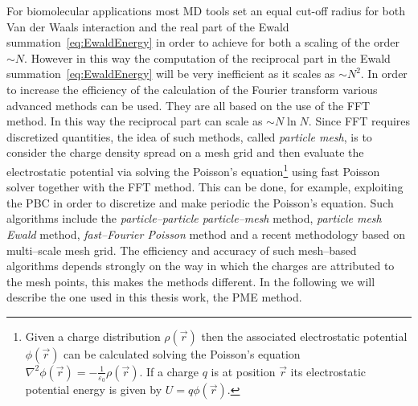 For biomolecular applications most \ac{MD} tools set an equal cut-off radius for both Van der Waals interaction
and the real part of the Ewald summation~\eqref{eq:EwaldEnergy} in order to achieve for both a scaling of the
order $\sim N$. However in this way the computation of the reciprocal part in the Ewald
summation~\eqref{eq:EwaldEnergy} will be very inefficient as it scales as $\sim N^2$. In order to increase the
efficiency of the calculation of the Fourier transform various advanced methods can be used. They are all based
on the use of the \ac{FFT} method. In this way the reciprocal part can scale as $\sim N\ln N$. Since \ac{FFT}
requires discretized quantities, the idea of such methods, called \textit{particle mesh}, is to consider the
charge density spread on a mesh grid and then evaluate the electrostatic potential via solving the Poisson's
equation\footnote{Given a charge distribution $\rho(\vec r)$ then the associated electrostatic potential
$\phi(\vec r)$ can be calculated solving the Poisson's equation $\displaystyle \nabla^2\phi(\vec r) = -\frac{1}{\varepsilon_0} \rho(\vec r)$. If a charge $q$ is at position $\vec r$ its electrostatic potential energy is given by $U = q\phi(\vec r)$.}
using fast Poisson solver together with the \ac{FFT} method. This can be done, for example, exploiting the
\ac{PBC} in order to discretize and make periodic the Poisson's equation.
Such algorithms include the \textit{particle--particle particle--mesh} method, \textit{particle mesh Ewald}
method, \textit{fast--Fourier Poisson} method and a recent methodology based on multi--scale mesh grid. The
efficiency and accuracy of such mesh--based algorithms depends strongly on the way in which the charges are
attributed to the mesh points, this makes the methods different. In the following we will describe the one used
in this thesis work, the \acf{PME} method.

